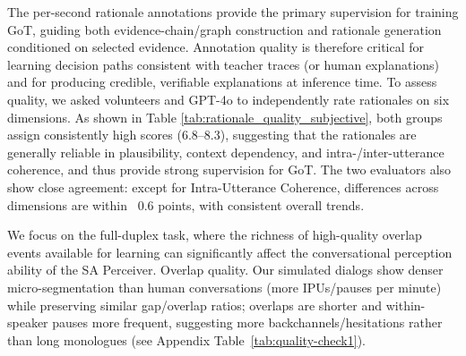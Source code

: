 The per-second rationale annotations provide the primary supervision for training GoT, guiding both evidence-chain/graph construction and rationale generation conditioned on selected evidence. Annotation quality is therefore critical for learning decision paths consistent with teacher traces (or human explanations) and for producing credible, verifiable explanations at inference time.
To assess quality, we asked volunteers and GPT-4o to independently rate rationales on six dimensions. As shown in Table \ref{tab:rationale_quality_subjective}, both groups assign consistently high scores (6.8–8.3), suggesting that the rationales are generally reliable in plausibility, context dependency, and intra-/inter-utterance coherence, and thus provide strong supervision for GoT. The two evaluators also show close agreement: except for Intra-Utterance Coherence, differences across dimensions are within ~0.6 points, with consistent overall trends.
\begin{table}[t]
\centering
\caption{Subjective comparison between human volunteers and GPT-4o across six rationale quality dimensions.}
\label{tab:rationale_quality_subjective}
{\fontsize{6}{6.5}\selectfont
\renewcommand{\arraystretch}{0.92}
\setlength{\tabcolsep}{3pt}
}
\end{table}


We focus on the full-duplex task, where the richness of high-quality overlap events available for learning can significantly affect the conversational perception ability of the SA Perceiver. Overlap quality. Our simulated dialogs show denser micro-segmentation than human conversations (more IPUs/pauses per minute) while preserving similar gap/overlap ratios; overlaps are shorter and within-speaker pauses more frequent, suggesting more backchannels/hesitations rather than long monologues (see Appendix Table~\ref{tab:quality-check1}).

